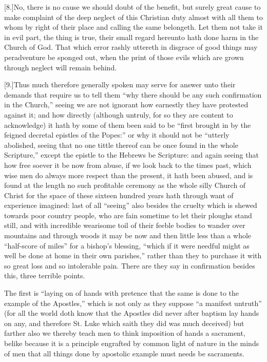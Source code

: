 [8.]No, there is no cause we should doubt of the benefit, but surely great cause to make complaint of the deep neglect of this Christian duty almost with all them to whom by right of their place and calling the same belongeth. Let them not take it in evil part, the thing is true, their small regard hereunto hath done harm in the Church of God. That which error rashly uttereth in disgrace of good things  may peradventure be sponged out,
 when the print of those evils which are grown through neglect will remain behind.

[9.]Thus much therefore generally spoken may serve for answer unto their demands that require us to tell them “why there should be any such confirmation in the Church,” seeing we are not ignorant how earnestly they have protested against it; and how directly (although untruly, for so they are content to acknowledge) it hath by some of them been said to be “first brought in by the feigned decretal epistles of the Popes:” or why it should not be “utterly abolished, seeing that no one tittle thereof can be once found in the whole Scripture,” except the epistle to the Hebrews be Scripture: and again seeing that how free soever it be now from abuse, if we look back to the times past, which wise men do always more respect than the present, it hath been abused, and is found at the length no such profitable ceremony as the whole silly Church of Christ for the space of these sixteen hundred years hath through want of experience imagined: last of all “seeing” also besides the cruelty which is shewed towards poor country people, who are fain sometime to let their ploughs stand still, and with incredible wearisome toil of their feeble bodies to wander over mountains and through woods it may be now and then little less than a whole “half-score of miles” for a  bishop’s blessing, “which if it were needful might as well be done at home in their own parishes,” rather than they to purchase it with so great loss and so intolerable pain. There are they say in confirmation besides this, three terrible points.

The first is “laying on of hands with pretence that the same is done to the example of the Apostles,” which is not only as they suppose “a manifest untruth” (for all the world doth know that the Apostles did never after baptism lay hands on any, and therefore St. Luke which saith they did was much deceived) but farther also we thereby teach men to think imposition of hands a sacrament, belike because it is a principle engrafted by common light of nature in the minds of men that all things done by apostolic example must needs be sacraments.

